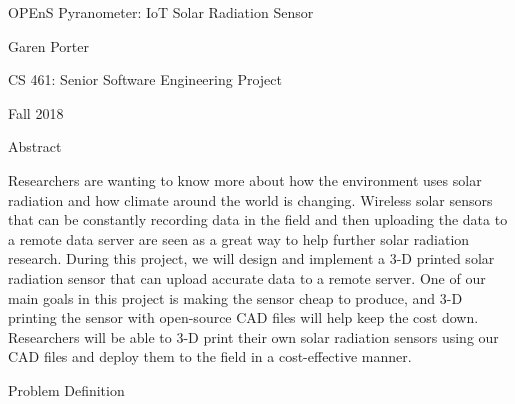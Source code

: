 \documentclass[10pt,draftclsnofoot,onecolumn,letterpaper]{article}
\begin{document}
    \begin{Center}
    {\fontsize{14pt}{16.8pt}\selectfont OPEnS Pyranometer: IoT Solar Radiation Sensor\par}
    \end{Center}\par
    
    \begin{Center}
    Garen Porter
    \end{Center}\par
    
    \begin{Center}
    CS 461: Senior Software Engineering Project
    \end{Center}\par
    
    \begin{Center}
    Fall 2018
    \end{Center}\par
    
    \begin{Center}
    {\fontsize{14pt}{16.8pt}\selectfont Abstract\par}
    \end{Center}\par
    
    {\fontsize{10pt}{12.0pt}\selectfont Researchers are wanting to know more about how the environment uses solar radiation and how climate around the world is changing. Wireless solar sensors that can be constantly recording data in the field and then uploading the data to a remote data server are seen as a great way to help further solar radiation research. During this project, we will design and implement a 3-D printed solar radiation sensor that can upload accurate data to a remote server. One of our main goals in this project is making the sensor cheap to produce, and 3-D printing the sensor with open-source CAD files will help keep the cost down. Researchers will be able to 3-D print their own solar radiation sensors using our CAD files and deploy them to the field in a cost-effective manner.\par}\par
    
    \newpage
    
    \vspace{\baselineskip}\begin{Center}
    {\fontsize{14pt}{16.8pt}\selectfont Problem Definition\par}
    \end{Center}\par
    
\end{document}
